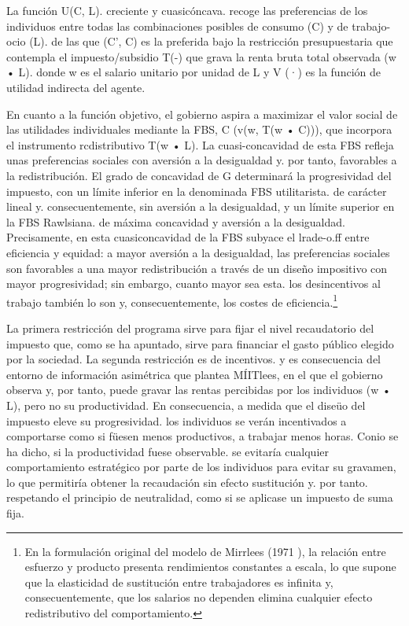\documentclass[10pt,a4paper]{article}
\begin{document}
La función U(C, L). creciente y cuasicóncava. recoge las preferencias de los individuos entre todas las combinaciones posibles de consumo (C) y de trabajo-ocio (L). de las que (C', C) es la preferida bajo la restricción presupuestaria que contempla el impuesto/subsidio T(-) que grava la renta bruta total observada (w • L). donde w es el salario unitario por unidad de L y V (·) es la función de utilidad indirecta del agente.

En cuanto a la función objetivo, el gobierno aspira a maximizar el valor social de las utilidades individuales mediante la FBS, C (v(w, T(w • C))), que incorpora el instrumento rcdistributivo T(w • L). La cuasi-concavidad de esta FBS refleja unas preferencias sociales con aversión a la desigualdad y. por tanto, favorables a la redistribución. El grado de concavidad de G determinará la progresividad del impuesto, con un límite inferior en la denominada FBS utilitarista. de carácter lineal y. consecuentemente, sin aversión a la desigualdad, y un límite superior en la FBS Rawlsiana. de máxima concavidad y aversión a la desigualdad. Precisamente, en esta cuasiconcavidad de la FBS subyace el lrade-o.ff entre eficiencia y equidad: a mayor aversión a la desigualdad, las preferencias sociales son favorables a una mayor redistribución a través de un diseño impositivo con mayor progresividad; sin embargo, cuanto mayor sea esta. los desincentivos al trabajo también lo son y, consecuentemente, los costes de eficiencia.\footnote{%
    En la formulación original del modelo de Mirrlees (1971 ), la relación entre esfuerzo y producto presenta rendimientos constantes a escala, lo que supone que la elasticidad de sustitución entre trabajadores es infinita y, consecuentemente, que los salarios no dependen elimina cualquier efecto redistributivo del comportamiento.
}

La primera restricción del programa sirve para fijar el nivel recaudatorio del impuesto que, como se ha apuntado, sirve para financiar el gasto público elegido por la sociedad. La segunda restricción es de incentivos. y es consecuencia del entorno de información asimétrica que plantea MÍITlees, en el que el gobierno observa y, por tanto, puede gravar las rentas percibidas por los individuos (w • L), pero no su productividad. En consecuencia, a medida que el diseüo del impuesto eleve su progresividad. los individuos se verán incentivados a comportarse como si füesen menos productivos, a trabajar menos horas. Conio se ha dicho, si la productividad fuese observable. se evitaría cualquier comportamiento estratégico por parte de los individuos para evitar su gravamen, lo que permitiría obtener la recaudación sin efecto sustitución y. por tanto. respetando el principio de neutralidad, como si se aplicase un impuesto de suma fija.
\end{document}
